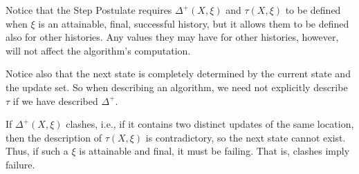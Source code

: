 \documentclass{LMCS}
\theoremstyle{definition}
\newcommand{\DD}{\Delta^+}
\begin{document}
Notice that the Step Postulate requires $\DD(X,\xi)$ and $\tau(X,\xi)$
to be defined when $\xi$ is an attainable, final, successful history,
but it allows them to be defined also for other histories.  Any values
they may have for other histories, however, will not affect the
algorithm's computation.

Notice also that the next state is completely determined by the
current state and the update set.  So when describing an algorithm, we
need not explicitly describe $\tau$ if we have described $\DD$.

If $\DD(X,\xi)$ clashes, i.e., if it contains two distinct updates of
the same location, then the description of $\tau(X,\xi)$ is
contradictory, so the next state cannot exist.  Thus, if such a $\xi$
is attainable and final, it must be failing.  That is, clashes imply
failure.
\end{document}
